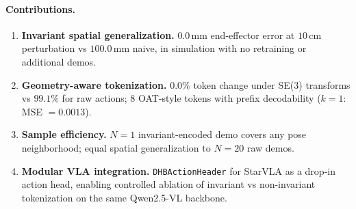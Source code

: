 \paragraph{Contributions.}
\begin{enumerate}
\item \textbf{Invariant spatial generalization.}
$0.0\,\text{mm}$ end-effector error at $10\,\text{cm}$ perturbation vs $100.0\,\text{mm}$
naive, in simulation with no retraining or additional demos.

\item \textbf{Geometry-aware tokenization.}
$0.0\%$ token change under SE(3) transforms vs $99.1\%$ for raw actions;
8 OAT-style tokens with prefix decodability ($k{=}1$: MSE $= 0.0013$).

\item \textbf{Sample efficiency.}
$N{=}1$ invariant-encoded demo covers any pose neighborhood;
equal spatial generalization to $N{=}20$ raw demos.

\item \textbf{Modular VLA integration.}
\texttt{DHBActionHeader} for StarVLA as a drop-in action head,
enabling controlled ablation of invariant vs non-invariant tokenization
on the same Qwen2.5-VL backbone.
\end{enumerate}
